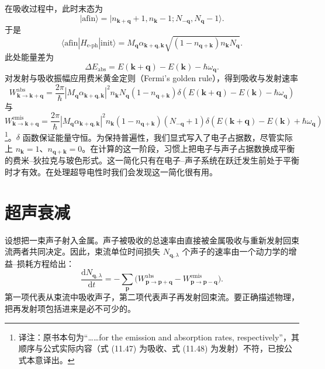 在吸收过程中，此时末态为
\begin{equation*}
|\mathrm{afin}\rangle=|n_{\mathbf{k}+\mathbf{q}}+1,n_{\mathbf{k}}-1;N_{-\mathbf{q}},N_{\mathbf{q}}-1\rangle.\tag{11.44}
\end{equation*}
于是
\begin{equation*}
\langle\mathrm{afin}|H_{\text{e-ph}}|\mathrm{init}\rangle=M_{\mathbf{q}}\alpha_{\mathbf{k}+\mathbf{q},\mathbf{k}}\sqrt{(1-n_{\mathbf{q}+\mathbf{k}})n_{\mathbf{k}}N_{\mathbf{q}}}.\tag{11.45}
\end{equation*}
此处能量差为
\begin{equation*}
\Delta E_{\mathrm{abs}}=E(\mathbf{k}+\mathbf{q})-E(\mathbf{k})-\hbar\omega_{\mathbf{q}}.\tag{11.46}
\end{equation*}
对发射与吸收振幅应用费米黄金定则（Fermi's golden rule），得到吸收与发射速率
\begin{equation*}
W^{\mathrm{abs}}_{\mathbf{k}\to\mathbf{k}+\mathbf{q}}=\frac{2\pi}{\hbar}|M_{\mathbf{q}}\alpha_{\mathbf{k}+\mathbf{q},\mathbf{k}}|^2 n_{\mathbf{k}}N_{\mathbf{q}}(1-n_{\mathbf{q}+\mathbf{k}})\delta(E(\mathbf{k}+\mathbf{q})-E(\mathbf{k})-\hbar\omega_{\mathbf{q}})\tag{11.47}
\end{equation*}
与
\begin{equation*}
W^{\mathrm{emis}}_{\mathbf{k}\to\mathbf{k}+\mathbf{q}}=\frac{2\pi}{\hbar}|M_{\mathbf{q}}\alpha_{\mathbf{k}+\mathbf{q},\mathbf{k}}|^2 n_{\mathbf{k}}(1-n_{\mathbf{q}+\mathbf{k}})(N_{-\mathbf{q}}+1)\delta(E(\mathbf{k}+\mathbf{q})-E(\mathbf{k})+\hbar\omega_{\mathbf{q}})\tag{11.48}
\end{equation*}
\footnote{译注：原书本句为“……for the emission and absorption rates, respectively”，其顺序与公式实际内容（式 (11.47) 为吸收、式 (11.48) 为发射）不符，已按公式本意译出。}。$\delta$ 函数保证能量守恒。为保持普遍性，我们显式写入了电子占据数，尽管实际上 $n_{\mathbf{k}}=1$、$n_{\mathbf{q}+\mathbf{k}}=0$。在计算的这一阶段，习惯上把电子与声子占据数换成平衡的费米–狄拉克与玻色形式。这一简化只有在电子–声子系统在跃迁发生前处于平衡时才有效。在处理超导电性时我们会发现这一简化很有用。

\section{超声衰减}

设想把一束声子射入金属。声子被吸收的总速率由直接被金属吸收与重新发射回束流两者共同决定。因此，束流单位时间损失 $N_{\mathbf{q},\lambda}$ 个声子的速率由一个动力学的增益–损耗方程给出：
\begin{equation*}
\frac{\mathrm{d}N_{\mathbf{q},\lambda}}{\mathrm{d}t}=-\sum_{\mathbf{p}}\bigl(W^{\mathrm{abs}}_{\mathbf{p}\to\mathbf{p}+\mathbf{q}}-W^{\mathrm{emis}}_{\mathbf{p}\to\mathbf{p}-\mathbf{q}}\bigr).\tag{11.49}
\end{equation*}
第一项代表从束流中吸收声子，第二项代表声子再发射回束流。要正确描述物理，把再发射项包括进来是必不可少的。

